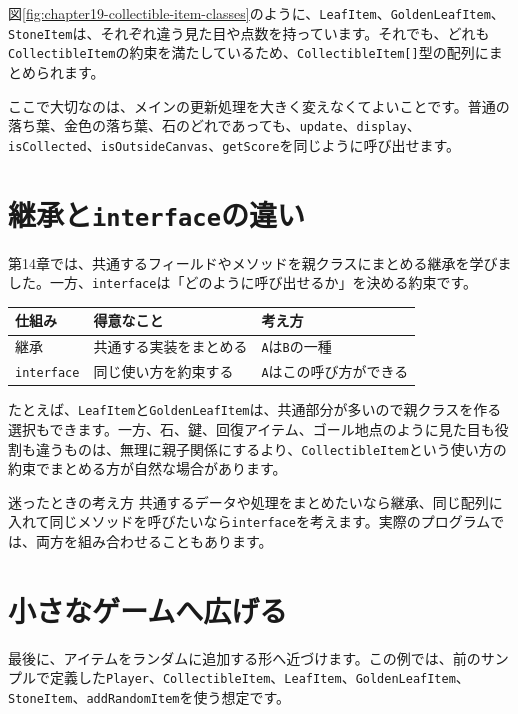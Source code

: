 図\ref{fig:chapter19-collectible-item-classes}のように、\texttt{LeafItem}、\texttt{GoldenLeafItem}、\texttt{StoneItem}は、それぞれ違う見た目や点数を持っています。それでも、どれも\texttt{CollectibleItem}の約束を満たしているため、\texttt{CollectibleItem[]}型の配列にまとめられます。

ここで大切なのは、メインの更新処理を大きく変えなくてよいことです。普通の落ち葉、金色の落ち葉、石のどれであっても、\texttt{update}、\texttt{display}、\texttt{isCollected}、\texttt{isOutsideCanvas}、\texttt{getScore}を同じように呼び出せます。

\section{継承と\texttt{interface}の違い}

第14章では、共通するフィールドやメソッドを親クラスにまとめる継承を学びました。一方、\texttt{interface}は「どのように呼び出せるか」を決める約束です。

\begin{center}
\begin{tabular}{lll}
\toprule
仕組み & 得意なこと & 考え方 \\
\midrule
継承 & 共通する実装をまとめる & \texttt{A}は\texttt{B}の一種 \\
\texttt{interface} & 同じ使い方を約束する & \texttt{A}はこの呼び方ができる \\
\bottomrule
\end{tabular}
\end{center}

たとえば、\texttt{LeafItem}と\texttt{GoldenLeafItem}は、共通部分が多いので親クラスを作る選択もできます。一方、石、鍵、回復アイテム、ゴール地点のように見た目も役割も違うものは、無理に親子関係にするより、\texttt{CollectibleItem}という使い方の約束でまとめる方が自然な場合があります。

\begin{notebox}{迷ったときの考え方}
共通するデータや処理をまとめたいなら継承、同じ配列に入れて同じメソッドを呼びたいなら\texttt{interface}を考えます。実際のプログラムでは、両方を組み合わせることもあります。
\end{notebox}

\section{小さなゲームへ広げる}

最後に、アイテムをランダムに追加する形へ近づけます。この例では、前のサンプルで定義した\texttt{Player}、\texttt{CollectibleItem}、\texttt{LeafItem}、\texttt{GoldenLeafItem}、\texttt{StoneItem}、\texttt{addRandomItem}を使う想定です。

